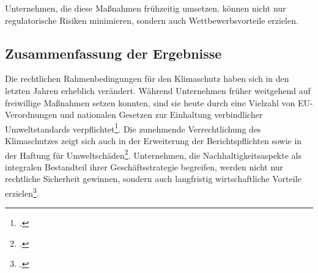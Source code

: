 Unternehmen, die diese Maßnahmen frühzeitig umsetzen, können nicht nur regulatorische Risiken minimieren, sondern auch Wettbewerbsvorteile erzielen.

\subsection{Zusammenfassung der Ergebnisse}

Die rechtlichen Rahmenbedingungen für den Klimaschutz haben sich in den letzten Jahren erheblich verändert. Während Unternehmen früher weitgehend auf freiwillige Maßnahmen setzen konnten, sind sie heute durch eine Vielzahl von EU-Verordnungen und nationalen Gesetzen zur Einhaltung verbindlicher Umweltstandards verpflichtet\footcite[]{eu_klimapolitik}.  
%
Die zunehmende Verrechtlichung des Klimaschutzes zeigt sich auch in der Erweiterung der Berichtspflichten sowie in der Haftung für Umweltschäden\footcite[]{eu_umwelthaftung}.  
%
Unternehmen, die Nachhaltigkeitsaspekte als integralen Bestandteil ihrer Geschäftsstrategie begreifen, werden nicht nur rechtliche Sicherheit gewinnen, sondern auch langfristig wirtschaftliche Vorteile erzielen\footcite[]{eu_csrd}.  


